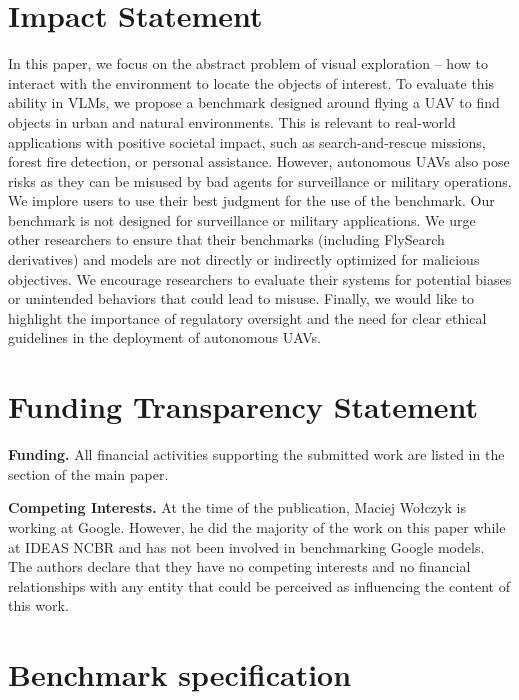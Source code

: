 \newpage

\appendix
\setcounter{figure}{0}
\renewcommand{\thefigure}{S\arabic{figure}}
\setcounter{table}{0}
\renewcommand{\thetable}{S\arabic{table}}
\onecolumn


\section{Impact Statement}
\label{sec:impact}
In this paper, we focus on the abstract problem of visual exploration -- how to interact with the environment to locate the objects of interest. To evaluate this ability in VLMs, we propose a benchmark designed around flying a UAV to find objects in urban and natural environments. This is relevant to real-world applications with positive societal impact, such as search-and-rescue missions, forest fire detection, or personal assistance. However, autonomous UAVs also pose risks as they can be misused by bad agents for surveillance or military operations. We implore users to use their best judgment for the use of the benchmark. Our benchmark is not designed for surveillance or military applications. We urge other researchers to ensure that their benchmarks (including FlySearch derivatives) and models are not directly or indirectly optimized for malicious objectives. We encourage researchers to evaluate their systems for potential biases or unintended behaviors that could lead to misuse. Finally, we would like to highlight the importance of regulatory oversight and the need for clear ethical guidelines in the deployment of autonomous UAVs.

\section{Funding Transparency Statement}
\textbf{Funding.} All financial activities supporting the submitted work are listed in the  section of the main paper. 

\textbf{Competing Interests.} At the time of the publication, Maciej Wołczyk is working at Google. However, he did the majority of the work on this paper while at IDEAS NCBR and has not been involved in benchmarking Google models. The authors declare that they have no competing interests and no financial relationships with any entity that could be perceived as influencing the content of this work.


\section{Benchmark specification}

